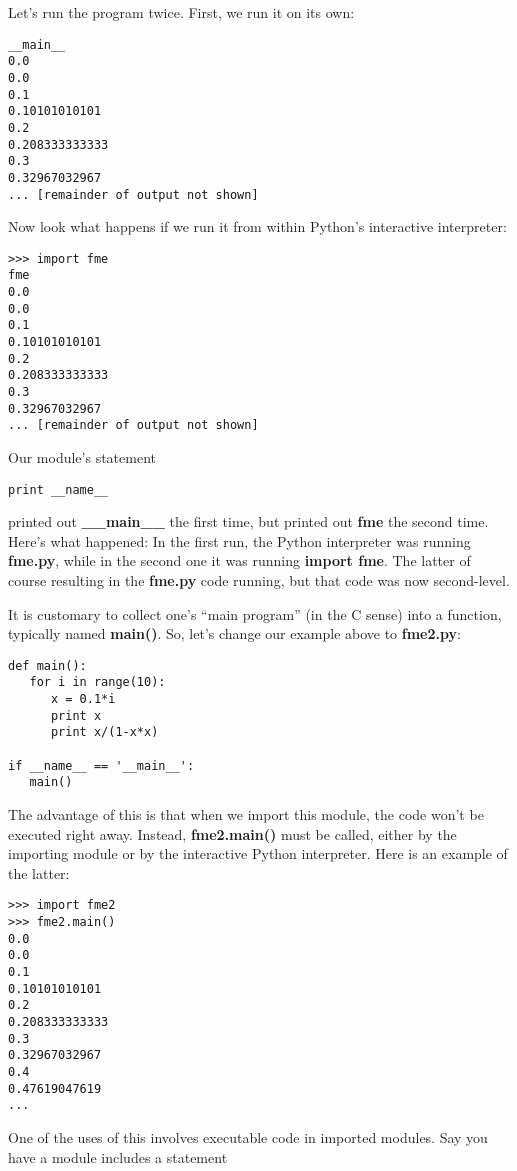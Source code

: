 Let's run the program twice.  First, we run it on its own:

\begin{Verbatim}[fontsize=\relsize{-2}]
% python fme.py
__main__
0.0
0.0
0.1
0.10101010101
0.2
0.208333333333
0.3
0.32967032967
... [remainder of output not shown]
\end{Verbatim}

Now look what happens if we run it from within Python's interactive
interpreter:

\begin{Verbatim}[fontsize=\relsize{-2}]
>>> import fme
fme
0.0
0.0
0.1
0.10101010101
0.2
0.208333333333
0.3
0.32967032967
... [remainder of output not shown]
\end{Verbatim}

Our module's statement

\begin{Verbatim}[fontsize=\relsize{-2}]
print __name__
\end{Verbatim}

printed out {\bf \_\_main\_\_} the first time, but printed out {\bf fme}
the second time.  Here's what happened:  In the first run, the 
Python interpreter was running {\bf fme.py}, while in the second one it
was running {\bf import fme}.  The latter of course resulting in the
{\bf fme.py} code running, but that code was now second-level.

It is customary to collect one's ``main program'' (in the C sense) into
a function, typically named {\bf main()}.  So, let's change our example
above to {\bf fme2.py}:

\begin{Verbatim}[fontsize=\relsize{-2}]
def main():
   for i in range(10):
      x = 0.1*i
      print x
      print x/(1-x*x)

if __name__ == '__main__':
   main()
\end{Verbatim}

The advantage of this is that when we import this module, the code won't
be executed right away.  Instead, {\bf fme2.main()} must be called,
either by the importing module or by the interactive Python interpreter.
Here is an example of the latter:

\begin{Verbatim}[fontsize=\relsize{-2}]
>>> import fme2
>>> fme2.main()
0.0
0.0
0.1
0.10101010101
0.2
0.208333333333
0.3
0.32967032967
0.4
0.47619047619
...
\end{Verbatim} 

One of the uses of this involves executable code in imported modules.
Say you have a module includes a statement


